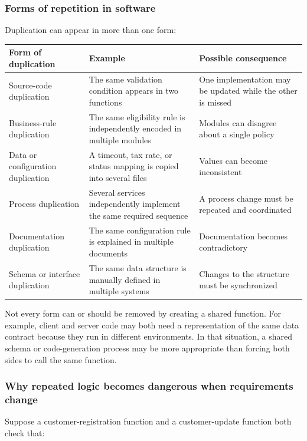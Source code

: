 \documentclass[12pt,a4paper]{article}
\begin{document}
\subsubsection{Forms of repetition in software}

Duplication can appear in more than one form:

\begin{table}[htbp]
\centering
\small
\begin{tabularx}{\textwidth}{>{\raggedright\arraybackslash}p{}XX}
\toprule
Form of duplication & Example & Possible consequence \\
\midrule
Source-code duplication & The same validation condition appears in two functions & One implementation may be updated while the other is missed \\
Business-rule duplication & The same eligibility rule is independently encoded in multiple modules & Modules can disagree about a single policy \\
Data or configuration duplication & A timeout, tax rate, or status mapping is copied into several files & Values can become inconsistent \\
Process duplication & Several services independently implement the same required sequence & A process change must be repeated and coordinated \\
Documentation duplication & The same configuration rule is explained in multiple documents & Documentation becomes contradictory \\
Schema or interface duplication & The same data structure is manually defined in multiple systems & Changes to the structure must be synchronized \\
\bottomrule
\end{tabularx}
\end{table}

Not every form can or should be removed by creating a shared function. For example, client and server code may both need a representation of the same data contract because they run in different environments. In that situation, a shared schema or code-generation process may be more appropriate than forcing both sides to call the same function.

\subsubsection{Why repeated logic becomes dangerous when requirements change}

Suppose a customer-registration function and a customer-update function both check that:
\end{document}
